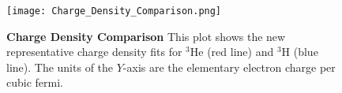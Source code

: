 \begin{figure}[!ht]
	\begin{center}
	\texttt{[image: Charge\_Density\_Comparison.png]}
	\end{center}
	\caption[Charge Density Comparison]{
	{\bf{Charge Density Comparison}} This plot shows the new representative charge density fits for $^3$He (red line) and $^3$H (blue line). The units of the $Y$-axis are the elementary electron charge per cubic fermi.}
	\label{fig:charge_density_comparison}
\end{figure}
